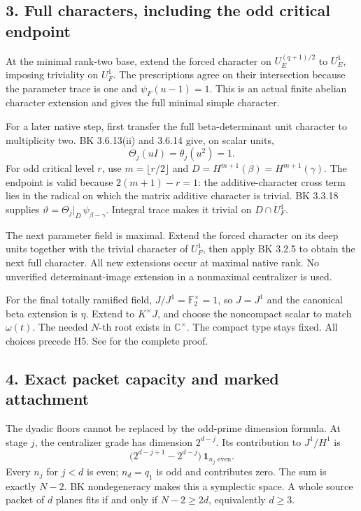\hypertarget{dyadic_synthesis-full-characters-including-the-odd-critical-endpoint}{%
\subsection{3. Full characters, including the odd critical
endpoint}\label{dyadic_synthesis-full-characters-including-the-odd-critical-endpoint}}

At the minimal rank-two base, extend the forced character on
\(U_E^{(q+1)/2}\) to \(U_E^1\), imposing triviality on \(U_F^1\). The
prescriptions agree on their intersection because the parameter trace is
one and \(\psi_F(u-1)=1\). This is an actual finite abelian character
extension and gives the full minimal simple character.

For a later native step, first transfer the full beta-determinant unit
character to multiplicity two. BK 3.6.13(ii) and 3.6.14 give, on scalar
units, \[
\Theta_j(uI)=\theta_j(u^2)=1.
\] For odd critical level \(r\), use \(m=\lfloor r/2\rfloor\) and
\(D=H^{m+1}(\beta)=H^{m+1}(\gamma)\). The endpoint is valid because
\(2(m+1)-r=1\): the additive-character cross term lies in the radical on
which the matrix additive character is trivial. BK 3.3.18 supplies
\(\vartheta=\Theta_j|_D\,\psi_{\beta-\gamma}\). Integral trace makes it
trivial on \(D\cap U_F^1\).

The next parameter field is maximal. Extend the forced character on its
deep units together with the trivial character of \(U_F^1\), then apply
BK 3.2.5 to obtain the next full character. All new extensions occur at
maximal native rank. No unverified determinant-image extension in a
nonmaximal centralizer is used.

For the final totally ramified field, \(J/J^1=\mathbb F_2^\times=1\), so
\(J=J^1\) and the canonical beta extension is \(\eta\). Extend to
\(K^\times J\), and choose the noncompact scalar to match \(\omega(t)\).
The needed \(N\)-th root exists in \(\mathbb C^\times\). The compact
type stays fixed. All choices precede H5. See
 for the complete proof.

\hypertarget{dyadic_synthesis-exact-packet-capacity-and-marked-attachment}{%
\subsection{4. Exact packet capacity and marked
attachment}\label{dyadic_synthesis-exact-packet-capacity-and-marked-attachment}}

The dyadic floors cannot be replaced by the odd-prime dimension formula.
At stage \(j\), the centralizer grade has dimension \(2^{d-j}\). Its
contribution to \(J^1/H^1\) is \[
\bigl(2^{d-j+1}-2^{d-j}\bigr)\,\mathbf1_{n_j\text{ even}}.
\] Every \(n_j\) for \(j<d\) is even; \(n_d=q_1\) is odd and contributes
zero. The sum is exactly \(N-2\). BK nondegeneracy makes this a
symplectic space. A whole source packet of \(d\) planes fits if and only
if \(N-2\ge2d\), equivalently \(d\ge3\).

